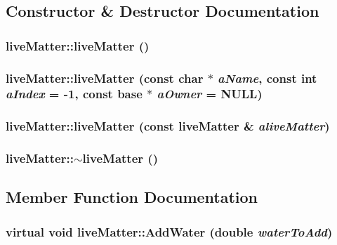 \subsection{Constructor \& Destructor Documentation}
\hypertarget{classlive_matter_aaa245231cc5d955c11ded92f5282d119}{
\subsubsection[{liveMatter}]{\setlength{\rightskip}{0pt plus 5cm}liveMatter::liveMatter ()}}
\label{classlive_matter_aaa245231cc5d955c11ded92f5282d119}
\hypertarget{classlive_matter_a6fe81bb25ccd78291b831d0b28d591d8}{
\subsubsection[{liveMatter}]{\setlength{\rightskip}{0pt plus 5cm}liveMatter::liveMatter (const char $\ast$ {\em aName}, \/  const int {\em aIndex} = {\ttfamily -\/1}, \/  const {\bf base} $\ast$ {\em aOwner} = {\ttfamily NULL})}}
\label{classlive_matter_a6fe81bb25ccd78291b831d0b28d591d8}
\hypertarget{classlive_matter_afb5cf140fc63fc56baf5c36498aa1149}{
\subsubsection[{liveMatter}]{\setlength{\rightskip}{0pt plus 5cm}liveMatter::liveMatter (const {\bf liveMatter} \& {\em aliveMatter})}}
\label{classlive_matter_afb5cf140fc63fc56baf5c36498aa1149}
\hypertarget{classlive_matter_a51b9cba8c15a51acec3c4e1357d1b6f4}{
\subsubsection[{$\sim$liveMatter}]{\setlength{\rightskip}{0pt plus 5cm}liveMatter::$\sim$liveMatter ()}}
\label{classlive_matter_a51b9cba8c15a51acec3c4e1357d1b6f4}


\subsection{Member Function Documentation}
\hypertarget{classlive_matter_af84f48b8ee8f67cea63b35d033cefe3b}{
\subsubsection[{AddWater}]{\setlength{\rightskip}{0pt plus 5cm}virtual void liveMatter::AddWater (double {\em waterToAdd})}}
\label{classlive_matter_af84f48b8ee8f67cea63b35d033cefe3b}


